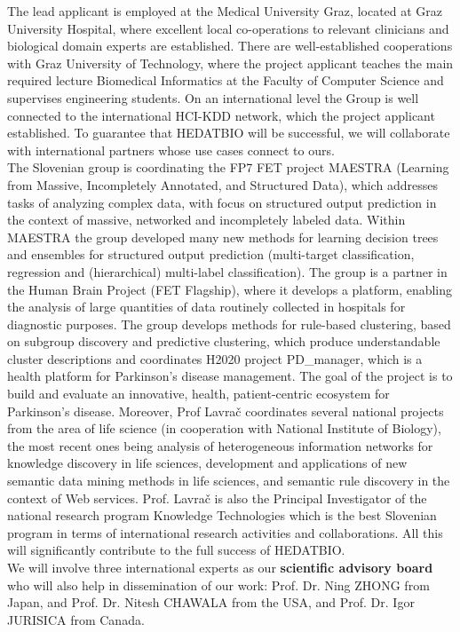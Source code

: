 \documentclass[a4paper,11pt]{article}
\begin{document}
The lead applicant is employed at the Medical University Graz, located at Graz University Hospital, where excellent local co-operations to relevant clinicians and biological domain experts are established. There are well-established cooperations with Graz University of Technology, where the project applicant teaches the main required lecture Biomedical Informatics at the Faculty of Computer Science and supervises engineering students. On an international level the Group is well connected to the international HCI-KDD network, which the project applicant established. To guarantee that HEDATBIO will be successful, we will collaborate with international partners whose use cases connect to ours. 
\\[0,2cm]
The Slovenian group is coordinating the FP7 FET project MAESTRA (Learning from Massive, Incompletely Annotated, and Structured Data), which addresses tasks of analyzing complex data, with focus on structured output prediction in the context of massive, networked and incompletely labeled data. Within MAESTRA the group developed many new methods for learning decision trees and ensembles for structured output prediction (multi-target classification, regression and (hierarchical) multi-label classification). The group is a partner in the Human Brain Project (FET Flagship), where it develops a platform, enabling the analysis of large quantities of data routinely collected in hospitals for diagnostic purposes. The group develops methods for rule-based clustering, based on subgroup discovery and predictive clustering, which produce understandable cluster descriptions and coordinates H2020 project PD\_manager, which is a health platform for Parkinson's disease management. The goal of the project is to build and evaluate an innovative, health, patient-centric ecosystem for Parkinson’s disease. Moreover, Prof Lavra\v{c} coordinates several national projects from the area of life science (in cooperation with National Institute of Biology), the most recent ones being analysis of heterogeneous information networks for knowledge discovery in life sciences, development and applications of new semantic data mining methods in life sciences, and semantic rule discovery in the context of Web services. Prof. Lavra\v{c} is also the Principal Investigator of the national research program Knowledge Technologies which is the best Slovenian program in terms of international research activities and collaborations. All this will significantly contribute to the full success of HEDATBIO.
\\[0,2cm]
We will involve three international experts as our \textbf{scientific advisory board} who will also help in dissemination of our work: Prof. Dr. Ning ZHONG from Japan, and Prof. Dr. Nitesh CHAWALA from the USA, and Prof. Dr. Igor JURISICA from Canada.
\end{document}
